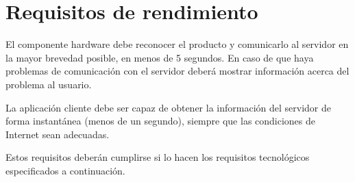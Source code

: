 \section{Requisitos de rendimiento}

El componente hardware debe reconocer el producto y comunicarlo al servidor en la mayor brevedad posible, en menos de 5 segundos. En caso de que haya problemas de comunicación con el servidor deberá mostrar información acerca del problema al usuario.

La aplicación cliente debe ser capaz de obtener la información del servidor de forma instantánea (menos de un segundo), siempre que las condiciones de Internet sean adecuadas.

Estos requisitos deberán cumplirse si lo hacen los requisitos tecnológicos especificados a continuación.
